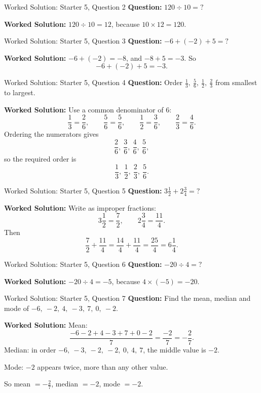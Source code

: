\documentclass{beamer}
\begin{document}
\begin{frame}{Worked Solution: Starter 5, Question 2}
\small
\textbf{Question:} \(120 \div 10=\mathord{?}\)

\smallskip
\textbf{Worked Solution:} \(120 \div 10 = 12\), because \(10 \times 12 = 120\).
\end{frame}

\begin{frame}{Worked Solution: Starter 5, Question 3}
\small
\textbf{Question:} \(-6+(-2)+5=\mathord{?}\)

\smallskip
\textbf{Worked Solution:} \(-6+(-2)=-8\), and \(-8+5=-3\). So
\[
-6+(-2)+5=-3.
\]
\end{frame}

\begin{frame}{Worked Solution: Starter 5, Question 4}
\small
\textbf{Question:} Order \(\frac13,\ \frac56,\ \frac12,\ \frac23\) from smallest to largest.

\smallskip
\textbf{Worked Solution:} Use a common denominator of \(6\):
\[
\frac13=\frac26,\qquad \frac56=\frac56,\qquad \frac12=\frac36,\qquad \frac23=\frac46.
\]
Ordering the numerators gives
\[
\frac26,\ \frac36,\ \frac46,\ \frac56,
\]
so the required order is
\[
\frac13,\ \frac12,\ \frac23,\ \frac56.
\]
\end{frame}

\begin{frame}{Worked Solution: Starter 5, Question 5}
\small
\textbf{Question:} \(3\frac12+2\frac34=\mathord{?}\)

\smallskip
\textbf{Worked Solution:} Write as improper fractions:
\[
3\frac12=\frac72,\qquad 2\frac34=\frac{11}{4}.
\]
Then
\[
\frac72+\frac{11}{4}=\frac{14}{4}+\frac{11}{4}=\frac{25}{4}=6\frac14.
\]
\end{frame}

\begin{frame}{Worked Solution: Starter 5, Question 6}
\small
\textbf{Question:} \(-20 \div 4=\mathord{?}\)

\smallskip
\textbf{Worked Solution:} \(-20 \div 4 = -5\), because \(4 \times (-5)=-20\).
\end{frame}

\begin{frame}{Worked Solution: Starter 5, Question 7}
\small
\textbf{Question:} Find the mean, median and mode of \(-6,\ -2,\ 4,\ -3,\ 7,\ 0,\ -2\).

\smallskip
\textbf{Worked Solution:} Mean:
\[
\frac{-6-2+4-3+7+0-2}{7}=\frac{-2}{7}=-\frac27.
\]
Median: in order \(-6,\ -3,\ -2,\ -2,\ 0,\ 4,\ 7\), the middle value is \(-2\).

Mode: \(-2\) appears twice, more than any other value.

So mean \(=-\frac27\), median \(=-2\), mode \(=-2\).
\end{frame}
\end{document}
